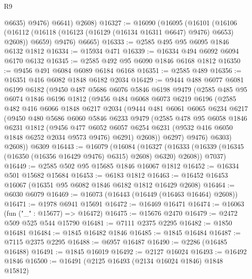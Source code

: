 \begin{lexlean}{R9}
\begin{coremodule}
            @6635)
          @9476)
        @6641)
      @2608)
@16327 := @16090
    (@16095
      (@16101
        (@16106 (@16112 (@16118 (@16123 (@16129 (@16134 @16311 @6647) @9476) @6653) @2608)) @6659)
        @9476)
      @6665)
@16333 := @2585 @495 @95 @6095 @1846 @6132 @1812
@16334 := @15934 @471
@16339 := @16334 @494 @6092 @6094 @6170 @6132
@16345 := @2585 @492 @95 @6090 @1846 @6168 @1812
@16350 := @9456 @491 @6084 @6089 @6184 @6168
@16351 := @2585 @489
@16356 := @16351 @416 @6082 @1848 @6182 @2034
@16429 := @9444
    @488
    @6077
    @6081
    @6199
    @6182
    (@9450
      @487
      @5686
      @6076
      @5846
      @6198
      @9479
      (@2585
        @485
        @95
        @6074
        @1846
        @6196
        @1812
        (@9456
          @484
          @6068
          @6073
          @6219
          @6196
          (@2585
            @482
            @416
            @6066
            @1848
            @6217
            @2034
            (@9444
              @481
              @6061
              @6065
              @6234
              @6217
              (@9450
                @480
                @5686
                @6060
                @5846
                @6233
                @9479
                (@2585
                  @478
                  @95
                  @6058
                  @1846
                  @6231
                  @1812
                  (@9456
                    @477
                    @6052
                    @6057
                    @6254
                    @6231
                    (@9532 @416 @6050 @1848 @6252 @2034 @9573 @9476)
                    @6291)
                  @2608))
              @6297)
            @9476)
          @6303)
        @2608))
    @6309
@16443 := @16079
    (@16084
      (@16327 (@16333 (@16339 (@16345 (@16350 (@16356 @16429 @9476) @6315) @2608) @6320) @2608))
      @7037)
@16449 := @2585 @502 @95 @15685 @1846 @16067 @1812
@16452 := @16334 @501 @15682 @15684
@16453 := @6183 @1812
@16463 := @16452 @16453 @16067 (@16351 @95 @6082 @1846 @6182 @1812 @16429 @2608)
@16464 := @6030 @6079
@16469 := @16073 (@16443 (@16449 (@16463 @16464) @2608))
@16471 := @1978 @6941 @15691
@16472 := @16469 @16471
@16474 := @16063 (fun ("_" : @15677) => @16472)
@16475 := @15676 @2470
@16479 := @2472 @509 @525 @544 @15790
@16481 := @7111 @2375 @2295
@16482 := @1850 @16481
@16484 := @1845 @16482 @1846
@16485 := @1845 @16484
@16487 := @7115 @2375 @2295
@16488 := @6957 @16487
@16490 := @2286 (@16485 @16488)
@16491 := @1845 @16019
@16492 := @2127 @16024
@16493 := @16492 @1846
@16500 := @16491 (@2125 @16493 (@2134 @16024 @1846) @1848 @15812)

\end{coremodule}
\end{lexlean}
